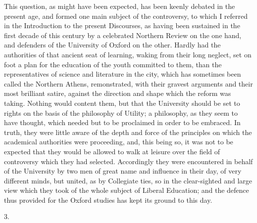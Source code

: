 This question, as might have been expected, has been keenly debated
in the present age, and formed one main subject of the controversy, to
which I referred in the Introduction to the present Discourses, as
having been sustained in the first decade of this century by a
celebrated Northern Review on the one hand, and defenders of the
University of Oxford on the other. Hardly had the authorities of that
ancient seat of learning, waking from their long neglect, set on foot
a plan for the education of the youth committed to them, than the
representatives of science and literature in the city, which has
sometimes been called the Northern Athens, remonstrated, with their
gravest arguments and their most brilliant satire, against the
direction and shape which the reform was taking. Nothing would content
them, but that the University should be set to rights on the basis of
the philosophy of Utility; a philosophy, as they seem to have thought,
which needed but to be proclaimed in order to be embraced. In truth,
they were little aware of the depth and force of the principles on
which the academical authorities were proceeding, and, this being so,
it was not to be expected that they would be allowed to walk at
leisure over the field of controversy which they had selected.
Accordingly they were encountered in behalf of the University by two
men of great name and influence in their day, of very different minds,
but united, as by Collegiate ties, so in the clear-sighted and large
view which they took of the whole subject of Liberal Education; and
the defence thus provided for the Oxford studies has kept its ground
to this day.

3.

